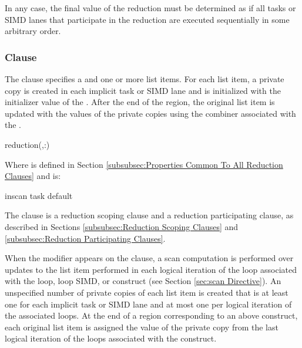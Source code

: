 In any case, the final value of the reduction must be determined as if all tasks
or SIMD lanes that participate in the reduction are executed sequentially in
some arbitrary order.










\subsubsection{ Clause}
\label{subsubsec:reduction clause}
\summary
The  clause specifies a  and one or
more list items. For each list item, a private copy is created in each implicit
task or SIMD lane and is initialized with the initializer value of the
. After the end of the region, the original list item
is updated with the values of the private copies using the combiner associated
with the .

\syntax
\begin{ompSyntax}
reduction(\plc{[reduction-modifier},\plc{] }:)
\end{ompSyntax}

Where  is defined in Section
\ref{subsubsec:Properties Common To All Reduction Clauses} and
 is:
\begin{indentedcodelist}
inscan
task
default
\end{indentedcodelist}

\descr
The  clause is a reduction scoping clause and a reduction
participating clause, as described in Sections \ref{subsubsec:Reduction Scoping
Clauses} and \ref{subsubsec:Reduction Participating Clauses}. 

When the  modifier appears on the clause, a scan computation is
performed over updates to the list item performed in each logical iteration of
the loop associated with the loop, loop SIMD, or  construct (see
Section \ref{sec:scan Directive}).  An unspecified number of private copies of
each list item is created that is at least one for each implicit task or SIMD
lane and at most one per logical iteration of the associated loops. At the end
of a region corresponding to an above construct, each original list item is
assigned the value of the private copy from the last logical iteration of the
loops associated with the construct.
   
